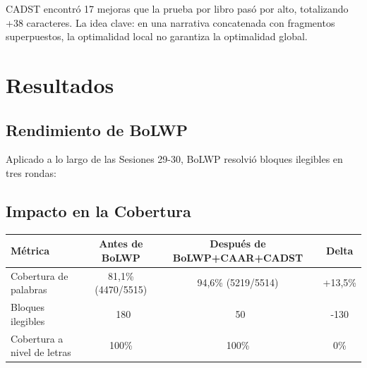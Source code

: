 \documentclass[11pt,a4paper]{article}
\begin{document}
CADST encontró 17 mejoras que la prueba por libro pasó por alto, totalizando +38 caracteres. La idea clave: en una narrativa concatenada con fragmentos superpuestos, la optimalidad local no garantiza la optimalidad global.

\section{Resultados}

\subsection{Rendimiento de BoLWP}

Aplicado a lo largo de las Sesiones 29-30, BoLWP resolvió bloques ilegibles en tres rondas:

\begin{table}[htbp]
\centering
{}
\end{table}

\subsection{Impacto en la Cobertura}

\begin{table}[htbp]
\centering
\begin{tabular}{lccc}
\toprule
\textbf{Métrica} & \textbf{Antes de BoLWP} & \textbf{Después de BoLWP+CAAR+CADST} & \textbf{Delta} \\
\midrule
Cobertura de palabras & 81,1\% (4470/5515) & 94,6\% (5219/5514) & +13,5\% \\
Bloques ilegibles & ~180 & ~50 & -130 \\
Cobertura a nivel de letras & 100\% & 100\% & 0\% \\
\bottomrule
\end{tabular}
\end{table}
\end{document}
